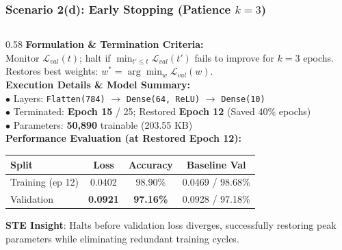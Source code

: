 {
\usebackgroundtemplate{\backgroundcontent}
\begin{frame}
    \frametitle{Scenario 2(d): Early Stopping (Patience $k = 3$)}
    \vspace{-0.30cm}
    \begin{columns}[T]
        \begin{column}{0.58\textwidth}
            \textbf{\scriptsize Formulation \& Termination Criteria:}\\[1pt]
            {\scriptsize Monitor $\mathcal{L}_{val}(t)$; halt if $\min_{t' \le t} \mathcal{L}_{val}(t')$ fails to improve for $k=3$ epochs. Restores best weights: $w^* = \arg\min_w \mathcal{L}_{val}(w)$.}\\[3pt]
            
            \textbf{\scriptsize Execution Details \& Model Summary:}\\[1pt]
            {\scriptsize
            $\bullet$ Layers: \texttt{Flatten(784)} $\to$ \texttt{Dense(64, ReLU)} $\to$ \texttt{Dense(10)}\\
            $\bullet$ Terminated: \textbf{Epoch 15} / 25; Restored \textbf{Epoch 12} (Saved 40\% epochs)\\
            $\bullet$ Parameters: \textbf{50,890} trainable (203.55 KB)
            }\\[3pt]
            
            \textbf{\scriptsize Performance Evaluation (at Restored Epoch 12):}\\[1pt]
            {\scriptsize
            \setlength{\tabcolsep}{3pt}
            \renewcommand{\arraystretch}{0.90}
            \begin{tabular}{lccc}
                \toprule
                \textbf{Split} & \textbf{Loss} & \textbf{Accuracy} & \textbf{Baseline Val} \\
                \midrule
                Training (ep 12) & 0.0402 & 98.90\% & 0.0469 / 98.68\% \\
                Validation & \textbf{0.0921} & \textbf{97.16\%} & 0.0928 / 97.18\% \\
                \bottomrule
            \end{tabular}
            \par\vspace{2pt}
            \textbf{STE Insight}: Halts before validation loss diverges, successfully restoring peak parameters while eliminating redundant training cycles.\par
            }
        \end{column}
        

\end{columns}
\end{frame}}
